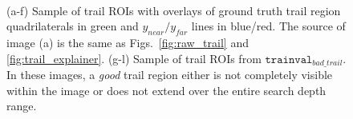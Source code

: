 \documentclass[letterpaper, 10 pt, conference]{ieeeconf}  %
\newcommand{\TrailBadAnnotatedSet}{\mathtt{trainval}_{bad\_trail}}
\newcommand{\TrailNearLine}{y_{near}}
\newcommand{\TrailFarLine}{y_{far}}
\begin{document}
\begin{figure}[!t]
\\
\vspace{-0.06in}
\caption{(a-f) Sample of trail ROIs with overlays of ground truth trail region quadrilaterals in green and $\TrailNearLine / \TrailFarLine$ lines in blue/red.  The source of image (a) is the same as Figs.~\ref{fig:raw_trail} and \ref{fig:trail_explainer}.  (g-l) Sample of trail ROIs from $\TrailBadAnnotatedSet$.  In these images, a \textit{good} trail region either is not completely visible within the image or does not extend over the entire search depth range.}
\label{fig:nearfar_explainer}
\end{figure}
\end{document}
